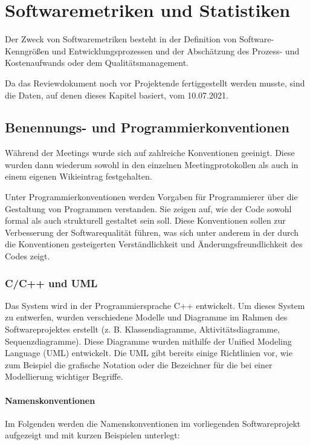 \documentclass[../review_3.tex]{subfiles}
\begin{document}
\chapter{Softwaremetriken und Statistiken}\thispagestyle{fancy}
Der Zweck von Softwaremetriken besteht in der \glqq Definition von Software-Kenngrößen und Entwicklungsprozessen\grqq{} und der \glqq Abschätzung des Prozess- und Kostenaufwands oder dem Qualitätsmanagement\grqq{}\cite{swmetriken}.

Da das Reviewdokument noch vor Projektende fertiggestellt werden musste, sind die Daten, auf denen dieses Kapitel basiert, vom 10.07.2021.

\section{Benennungs- und Programmierkonventionen}
Während der Meetings wurde sich auf zahlreiche Konventionen geeinigt. Diese wurden dann wiederum sowohl in den einzelnen Meetingprotokollen als auch in einem eigenen Wikieintrag festgehalten.

Unter Programmierkonventionen werden \glqq Vorgaben für Programmierer über die Gestaltung von Programmen\grqq{} \cite{progkonv} verstanden. Sie zeigen auf, wie der Code sowohl formal als auch strukturell gestaltet sein soll. Diese Konventionen sollen zur Verbesserung der Softwarequalität führen, was sich unter anderem in der durch die Konventionen gesteigerten Verständlichkeit und Änderungsfreundlichkeit des Codes zeigt.

\subsection{C/C++ und UML}
Das System wird in der Programmiersprache C++ entwickelt. Um dieses System zu entwerfen, wurden verschiedene Modelle und Diagramme im Rahmen des Softwareprojektes erstellt (z. B. Klassendiagramme, Aktivitätsdiagramme, Sequenzdiagramme). Diese Diagramme wurden mithilfe der Unified Modeling Language (UML) entwickelt. Die UML gibt bereits einige Richtlinien vor, wie zum Beispiel die grafische Notation oder die Bezeichner für die bei einer Modellierung wichtiger Begriffe.

\subsubsection{Namenskonventionen}
Im Folgenden werden die Namenskonventionen im vorliegenden Softwareprojekt aufgezeigt und mit kurzen Beispielen unterlegt:
\end{document}
